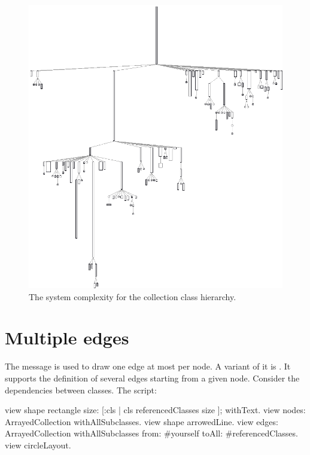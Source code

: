 \documentclass[a4paper,10pt,twoside]{book}
\begin{document}
\begin{figure}[htbp]
\centerline{\includegraphics[width=\linewidth]{picture5}}
\caption{The system complexity for the collection class hierarchy.}
\label{fig:picture5}
\end{figure}


\section{Multiple edges}

The message  is used to draw one edge at most per node. A variant of it is . It supports the definition of several edges starting from a given node. Consider the dependencies between classes. The script: 

\begin{code}{}
view shape rectangle
	size: [:cls | cls referencedClasses size ];
	withText.
view nodes: ArrayedCollection withAllSubclasses.
view shape arrowedLine.
view 
	edges: ArrayedCollection withAllSubclasses from: #yourself toAll: #referencedClasses.
view circleLayout.
\end{code}
\end{document}
